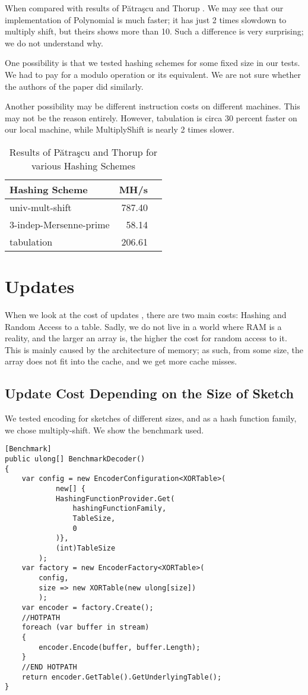 When compared with results of P\u{a}tra\c{s}cu and Thorup \cite{10.5555/2627817.2627833}. We may see that our implementation of Polynomial is much faster; it has just 2 times slowdown to multiply shift, but theirs shows more than 10. Such a difference is very surprising; we do not understand why. 

One possibility is that we tested hashing schemes for some fixed size in our tests. We had to pay for a modulo operation or its equivalent. We are not sure whether the authors of the paper did similarly.

Another possibility may be different instruction costs on different machines. This may not be the reason entirely. However, tabulation is circa 30 percent faster on our local machine, while MultiplyShift is nearly 2 times slower. 
\begin{table}[h!]
\centering
\begin{tabular}{l r r}
\toprule
Hashing Scheme & \multicolumn{1}{c}{MH/s} \\
\midrule
univ-mult-shift         & 787.40 \\
3-indep-Mersenne-prime  &  58.14 \\
tabulation            & 206.61 \\
\bottomrule
\end{tabular}
\caption{Results of P\u{a}tra\c{s}cu and Thorup for various Hashing Schemes}
\label{table:hashing_performance}
\end{table}

\section{Updates}
When we look at the cost of updates , there are two main costs: Hashing and Random Access to a table. Sadly, we do not live in a world where RAM is a reality, and the larger an array is, the higher the cost for random access to it.  This is mainly caused by the architecture of memory; as such, from some size, the array does not fit into the cache, and we get more cache misses.

\subsection{Update Cost Depending on the Size of Sketch}
We tested encoding for sketches of different sizes, and as a hash function family, we chose multiply-shift. We show the benchmark used.
\begin{lstlisting}
[Benchmark]
public ulong[] BenchmarkDecoder()
{
    var config = new EncoderConfiguration<XORTable>(
            new[] { 
            HashingFunctionProvider.Get(
                hashingFunctionFamily,
                TableSize, 
                0
            )},
            (int)TableSize
        );
    var factory = new EncoderFactory<XORTable>(
        config,
        size => new XORTable(new ulong[size])
        );
    var encoder = factory.Create();
    //HOTPATH
    foreach (var buffer in stream)
    {
        encoder.Encode(buffer, buffer.Length);
    }
    //END HOTPATH
    return encoder.GetTable().GetUnderlyingTable();
}    
\end{lstlisting}

